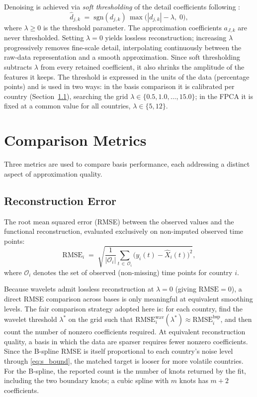 Denoising is achieved via \emph{soft thresholding} of the detail coefficients
following \cite{donoho1998}:
\begin{equation}
    \hat{d}_{j,k}
    \;=\;
    \mathrm{sgn}(d_{j,k})\,\max\!\bigl(|d_{j,k}| - \lambda,\;0\bigr),
    \label{eq:soft_threshold}
\end{equation}
where $\lambda \geq 0$ is the threshold parameter. The approximation
coefficients $a_{J,k}$ are never thresholded. Setting $\lambda = 0$ yields
lossless reconstruction; increasing $\lambda$ progressively removes fine-scale
detail, interpolating continuously between the raw-data representation and a
smooth approximation. Since soft thresholding subtracts $\lambda$ from every
retained coefficient, it also shrinks the amplitude of the features it keeps.
The threshold is expressed in the units of the data (percentage points) and is
used in two ways: in the basis comparison it is calibrated per country
(Section~\ref{subsec:rmse}), searching the grid
$\lambda \in \{0.5, 1.0, \dots, 15.0\}$; in the FPCA it is fixed at a common
value for all countries, $\lambda \in \{5, 12\}$.

\section{Comparison Metrics}
\label{sec:metrics}

Three metrics are used to compare basis performance, each addressing a distinct
aspect of approximation quality.

\subsection{Reconstruction Error}
\label{subsec:rmse}

The root mean squared error (RMSE) between the observed values and the functional
reconstruction, evaluated exclusively on non-imputed observed time points:
\begin{equation}
    \mathrm{RMSE}_i
    \;=\;
    \sqrt{\frac{1}{|\mathcal{O}_i|}
    \sum_{t\,\in\,\mathcal{O}_i}
    \bigl(y_i(t) - \hat{X}_i(t)\bigr)^2},
    \label{eq:rmse}
\end{equation}
where $\mathcal{O}_i$ denotes the set of observed (non-missing) time points
for country $i$.

Because wavelets admit lossless reconstruction at $\lambda = 0$
(giving $\mathrm{RMSE} = 0$), a direct RMSE comparison across bases is only
meaningful at equivalent smoothing levels. The fair comparison strategy adopted
here is: for each country, find the wavelet threshold $\lambda^*$ on the grid
such that $\mathrm{RMSE}_i^{\mathrm{wav}}(\lambda^*) \approx
\mathrm{RMSE}_i^{\mathrm{bsp}}$, and then count the number of nonzero
coefficients required. At equivalent reconstruction quality, a basis in which
the data are sparser requires fewer nonzero coefficients. Since the B-spline
RMSE is itself proportional to each country's noise level through
\eqref{eq:s_bound}, the matched target is looser for more volatile countries.
For the B-spline, the reported count is the number of knots returned by the
fit, including the two boundary knots; a cubic spline with $m$ knots has $m+2$
coefficients.

